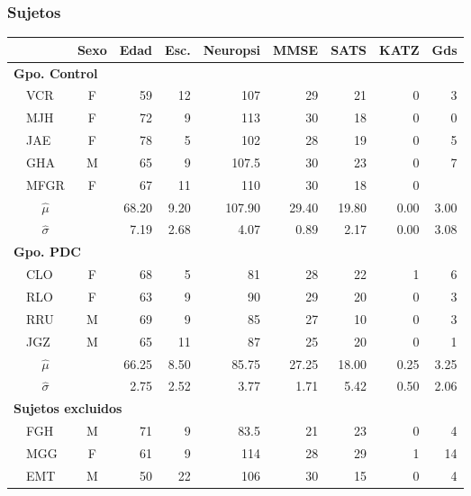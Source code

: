 \documentclass{beamer}
\newcommand{\bordes}[1]{\renewcommand{\arraystretch}{#1}}
\begin{document}

\begin{frame}\frametitle{Sujetos}
\begin{table}
\centering
\bordes{1.1}
\begin{tiny}
\begin{tabular}{llcrrrrrrr}
\toprule
 \phantom{mm}&
 & \textbf{Sexo} & \textbf{Edad} & \textbf{Esc.} & \textbf{Neuropsi} & \textbf{MMSE} & \textbf{SATS} & \textbf{KATZ} & \textbf{Gds} \\
\midrule
\multicolumn{6}{l}{\textbf{Gpo. Control}}\\
&VCR    & F    & 59   & 12   & 107      & 29   & 21   & 0    & 3 \\
&MJH    & F    & 72   & 9    & 113      & 30   & 18   & 0    & 0 \\
&JAE    & F    & 78   & 5    & 102      & 28   & 19   & 0    & 5 \\
&GHA    & M    & 65   & 9    & 107.5    & 30   & 23   & 0    & 7 \\
&MFGR   & F    & 67   & 11   & 110      & 30   & 18   & 0    &   \\
\rowcolor{gris}
&\multicolumn{1}{c}{$\widehat{\mu}$} & 
              & 68.20& 9.20 & 107.90   & 29.40& 19.80& 0.00 & 3.00\\
\rowcolor{gris}
&\multicolumn{1}{c}{$\widehat{\sigma}$} & 
              & 7.19 & 2.68 & 4.07     & 0.89 & 2.17 & 0.00 & 3.08\\
\midrule
\multicolumn{6}{l}{\textbf{Gpo. PDC}}\\
&CLO    & F    & 68   & 5    & 81       & 28   & 22   & 1    & 6 \\
&RLO    & F    & 63   & 9    & 90       & 29   & 20   & 0    & 3 \\
&RRU    & M    & 69   & 9    & 85       & 27   & 10   & 0    & 3 \\
&JGZ    & M    & 65   & 11   & 87       & 25   & 20   & 0    & 1 \\
\rowcolor{gris}
&\multicolumn{1}{c}{$\widehat{\mu}$} & 
              & 66.25& 8.50 & 85.75   & 27.25& 18.00& 0.25 & 3.25\\
\rowcolor{gris}
&\multicolumn{1}{c}{$\widehat{\sigma}$} & 
              & 2.75 & 2.52 & 3.77    & 1.71 & 5.42 & 0.50 & 2.06\\
\midrule
\multicolumn{6}{l}{\textbf{Sujetos excluidos}}\\
&FGH    & M    & 71   & 9    & 83.5     & 21   & 23   & 0    & 4  \\
&MGG    & F    & 61   & 9    & 114      & 28   & 29   & 1    & 14 \\
&EMT    & M    & 50   & 22   & 106      & 30   & 15   & 0    & 4  \\
\bottomrule
\end{tabular} 
\end{tiny}
\end{table}
\end{frame}
\end{document}
